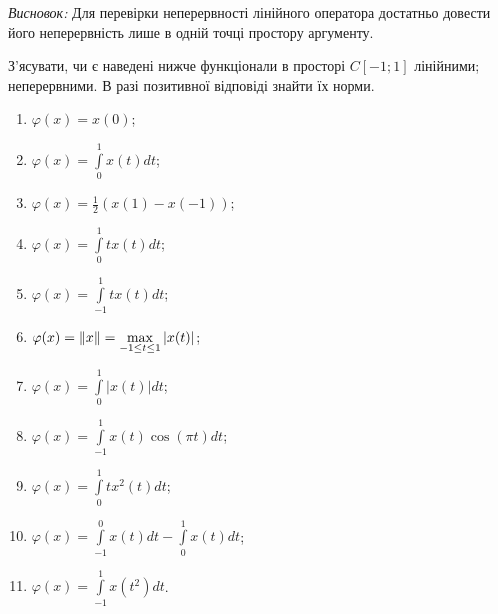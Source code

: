 \begin{theory}
    \emph{Висновок:} Для перевірки неперервності лінійного оператора достатньо 
    довести його неперервність лише в одній точці простору аргументу.
\end{theory}

\begin{exercise}
    З'ясувати, чи є наведені нижче функціонали в просторі $C{\left[-1; 1\right]}$ лінійними; 
    неперервними. В разі позитивної відповіді знайти їх норми. 
    \begin{enumerate}[label=\ukr*)]
        \item $\varphi(x) = x(0)$;
        \item $\varphi(x) = \int\limits_0^1x(t)dt$;
        \item $\varphi(x) = \frac{1}{2}(x(1) - x(-1))$;
        \item $\varphi(x) = \int\limits_0^1tx(t)dt$;
        \item $\varphi(x) = \int\limits_{-1}^1tx(t)dt$;
        \item $\varphi(x) = \left\lVert x\right\rVert = \max\limits_{-1 \leq t \leq 1} |x(t)|$;
        \item $\varphi(x) = \int\limits_0^1|x(t)|dt$;
        \item $\varphi(x) = \int\limits_{-1}^1x(t)\cos(\pi t)dt$;
        \item $\varphi(x) = \int\limits_0^1tx^2(t)dt$;
        \item $\varphi(x) = \int\limits_{-1}^0x(t)dt - \int\limits_0^1x(t)dt$;
        \item $\varphi(x) = \int\limits_{-1}^1x(t^2)dt$.
    \end{enumerate}
\end{exercise}

